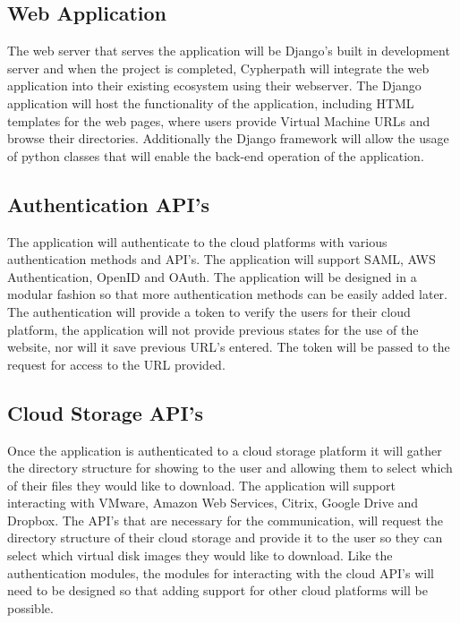 \documentclass{article}
\begin{document}
        \subsection{Web Application}
        The web server that serves the application will be Django's built in development server and when the project is completed, Cypherpath will integrate
        the web application into their existing ecosystem using their webserver. The Django application will host the functionality of the application, including HTML templates for the 
        web pages, where users provide Virtual Machine URLs and browse their directories. Additionally the Django framework will allow the usage of python classes that will enable the 
        back-end operation of the application.

        
        \subsection{Authentication API's}
        The application will authenticate to the cloud platforms with various authentication methods and API's. The application will support
        SAML, AWS Authentication, OpenID and OAuth. The application will be designed in a modular fashion so that more authentication methods can be easily added later.
        The authentication will provide a token to verify the users for their cloud platform, the application will not provide previous states for the use of the 
        website, nor will it save previous URL's entered. The token will be passed to the request for access to the URL provided.


        \subsection{Cloud Storage API's}
        Once the application is authenticated to a cloud storage platform it will gather the directory structure for showing to the user and allowing them to select
        which of their files they would like to download. The application will support interacting with VMware, Amazon Web Services, Citrix, Google Drive and Dropbox. The API's
        that are necessary for the communication, will request the directory structure of their cloud storage and provide it to the user so they can select which virtual disk
        images they would like to download. Like the authentication modules, the modules
        for interacting with the cloud API's will need to be designed so that adding support for other cloud platforms will be possible.
\end{document}
